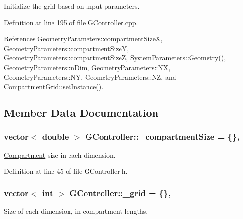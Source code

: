 Initialize the grid based on input parameters. 



Definition at line 195 of file G\+Controller.\+cpp.



References Geometry\+Parameters\+::compartment\+Size\+X, Geometry\+Parameters\+::compartment\+Size\+Y, Geometry\+Parameters\+::compartment\+Size\+Z, System\+Parameters\+::\+Geometry(), Geometry\+Parameters\+::n\+Dim, Geometry\+Parameters\+::\+N\+X, Geometry\+Parameters\+::\+N\+Y, Geometry\+Parameters\+::\+N\+Z, and Compartment\+Grid\+::set\+Instance().



\subsection{Member Data Documentation}
\hypertarget{classGController_a26bdd8b8d1667decda74bedf7bf25800}{
\subsubsection[{\+\_\+compartment\+Size}]{\setlength{\rightskip}{0pt plus 5cm}vector$<$ double $>$ G\+Controller\+::\+\_\+compartment\+Size = \{\}\hspace{0.3cm}{\ttfamily [static]}, {\ttfamily [private]}}}\label{classGController_a26bdd8b8d1667decda74bedf7bf25800}


\hyperlink{classCompartment}{Compartment} size in each dimension. 



Definition at line 45 of file G\+Controller.\+h.

\hypertarget{classGController_a2134b6522abe94d25206060b9684d265}{
\subsubsection[{\+\_\+grid}]{\setlength{\rightskip}{0pt plus 5cm}vector$<$ int $>$ G\+Controller\+::\+\_\+grid = \{\}\hspace{0.3cm}{\ttfamily [static]}, {\ttfamily [private]}}}\label{classGController_a2134b6522abe94d25206060b9684d265}


Size of each dimension, in compartment lengths. 



